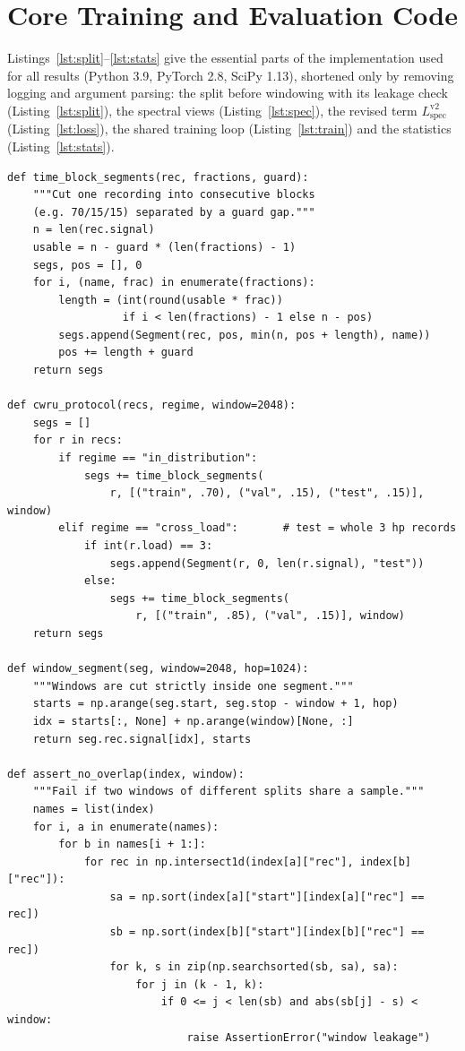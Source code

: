\documentclass[conference]{IEEEtran}
\newcommand{\Lspec}{L_{\mathrm{spec}}}
\begin{document}
\section{Core Training and Evaluation Code}
\label{app:code}
Listings~\ref{lst:split}--\ref{lst:stats} give the essential parts of the
implementation used for all results (Python 3.9, PyTorch 2.8, SciPy 1.13),
shortened only by removing logging and argument parsing: the split before
windowing with its leakage check (Listing~\ref{lst:split}), the spectral views
(Listing~\ref{lst:spec}), the revised term $\Lspec^{\mathrm{v2}}$
(Listing~\ref{lst:loss}), the shared training loop (Listing~\ref{lst:train}) and
the statistics (Listing~\ref{lst:stats}).

\begin{lstlisting}[float=*tp, caption={Split before windowing and leakage check.},label={lst:split}]
def time_block_segments(rec, fractions, guard):
    """Cut one recording into consecutive blocks
    (e.g. 70/15/15) separated by a guard gap."""
    n = len(rec.signal)
    usable = n - guard * (len(fractions) - 1)
    segs, pos = [], 0
    for i, (name, frac) in enumerate(fractions):
        length = (int(round(usable * frac))
                  if i < len(fractions) - 1 else n - pos)
        segs.append(Segment(rec, pos, min(n, pos + length), name))
        pos += length + guard
    return segs

def cwru_protocol(recs, regime, window=2048):
    segs = []
    for r in recs:
        if regime == "in_distribution":
            segs += time_block_segments(
                r, [("train", .70), ("val", .15), ("test", .15)], window)
        elif regime == "cross_load":       # test = whole 3 hp records
            if int(r.load) == 3:
                segs.append(Segment(r, 0, len(r.signal), "test"))
            else:
                segs += time_block_segments(
                    r, [("train", .85), ("val", .15)], window)
    return segs

def window_segment(seg, window=2048, hop=1024):
    """Windows are cut strictly inside one segment."""
    starts = np.arange(seg.start, seg.stop - window + 1, hop)
    idx = starts[:, None] + np.arange(window)[None, :]
    return seg.rec.signal[idx], starts

def assert_no_overlap(index, window):
    """Fail if two windows of different splits share a sample."""
    names = list(index)
    for i, a in enumerate(names):
        for b in names[i + 1:]:
            for rec in np.intersect1d(index[a]["rec"], index[b]["rec"]):
                sa = np.sort(index[a]["start"][index[a]["rec"] == rec])
                sb = np.sort(index[b]["start"][index[b]["rec"] == rec])
                for k, s in zip(np.searchsorted(sb, sa), sa):
                    for j in (k - 1, k):
                        if 0 <= j < len(sb) and abs(sb[j] - s) < window:
                            raise AssertionError("window leakage")
\end{lstlisting}
\end{document}

